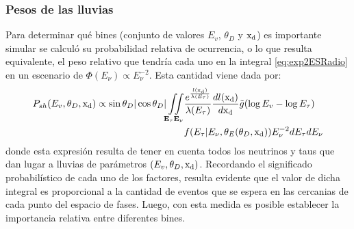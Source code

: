 	\subsubsection{Pesos de las lluvias}
	Para determinar qu\'e bines (conjunto de valores $E_v$, $\theta_D$ y ${\rm x_d}$) es importante simular se calcul\'o su probabilidad relativa de ocurrencia, o lo que resulta equivalente, el peso relativo que tendr\'ia cada uno en la integral \ref{eq:exp2ESRadio} en un escenario de $\Phi(E_\nu)\propto E_\nu^{-2}$.
	Esta cantidad viene dada por:
	\begin{equation}
		\begin{aligned}
			P_{sh}(E_v,\theta_D,{\rm x_d})
			\propto
			\sin{\theta_D}|\cos{\theta_D}|
			\iint\limits_{\mathbf{E_\tau}\mathbf{E_\nu}}&
			\frac{e^{\frac{l({\rm x_d})}{\lambda(E_\tau)}}}{\lambda(E_\tau)}\frac{dl({\rm x_d})}{d{\rm x_d}}
			\tilde{g}(\log E_v-\log E_\tau)\\
			&f(E_\tau|E_\nu,\theta_E(\theta_D,{\rm x_d}))
			E_\nu^{-2}
			dE_\tau dE_\nu
		\end{aligned}
		\label{eq:weightsRadio}
	\end{equation}
	donde esta expresi\'on resulta de tener en cuenta todos los neutrinos y taus que dan lugar a lluvias de par\'ametros $(E_v,\theta_D,{\rm x_d})$.
	Recordando el significado probabil\'istico de cada uno de los factores, resulta evidente que el valor de dicha integral es proporcional a la cantidad de eventos que se espera en las cercanias de cada punto del espacio de fases.
	Luego, con esta medida es posible establecer la importancia relativa entre diferentes bines.
	
